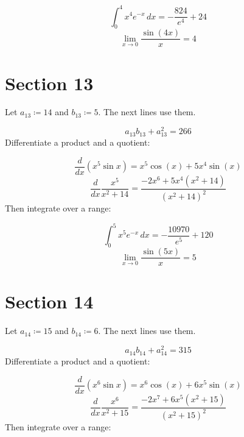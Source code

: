 \documentclass[11pt,a4paper]{article}
\theoremstyle{plain}
\theoremstyle{definition}
\theoremstyle{remark}
\begin{document}
\begin{equation*}
  \int_0^{4} x^{4} e^{-x} \, dx = -\frac{824}{e^{4}} + 24
\end{equation*}
\begin{equation*}
  \lim_{x \to 0} \frac{\sin(4 x)}{x} = 4
\end{equation*}
\section*{Section 13}

Let $a_{13} \coloneqq  14$ and $b_{13} \coloneqq  5$. The next lines use them.

\begin{equation*}
  a_{13} b_{13} + a_{13}^2 = 266
\end{equation*}
Differentiate a product and a quotient:

\begin{equation*}
  \frac{d}{dx} \left( x^{5} \sin x \right) = x^{5} \cos\left(x\right) + 5 x^{4} \sin\left(x\right)
\end{equation*}
\begin{equation*}
  \frac{d}{dx} \frac{x^{5}}{x^2 + 14} = \frac{-2 x^{6} + 5 x^{4} \left(x^{2} + 14\right)}{\left(x^{2} + 14\right)^{2}}
\end{equation*}
Then integrate over a range:

\begin{equation*}
  \int_0^{5} x^{5} e^{-x} \, dx = -\frac{10970}{e^{5}} + 120
\end{equation*}
\begin{equation*}
  \lim_{x \to 0} \frac{\sin(5 x)}{x} = 5
\end{equation*}
\section*{Section 14}

Let $a_{14} \coloneqq  15$ and $b_{14} \coloneqq  6$. The next lines use them.

\begin{equation*}
  a_{14} b_{14} + a_{14}^2 = 315
\end{equation*}
Differentiate a product and a quotient:

\begin{equation*}
  \frac{d}{dx} \left( x^{6} \sin x \right) = x^{6} \cos\left(x\right) + 6 x^{5} \sin\left(x\right)
\end{equation*}
\begin{equation*}
  \frac{d}{dx} \frac{x^{6}}{x^2 + 15} = \frac{-2 x^{7} + 6 x^{5} \left(x^{2} + 15\right)}{\left(x^{2} + 15\right)^{2}}
\end{equation*}
Then integrate over a range:
\end{document}
